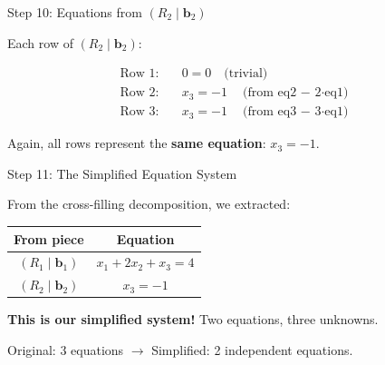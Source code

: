 \documentclass[10pt]{beamer}
\theoremstyle{definition}
\newcommand{\x}[1]{\alert{\textbf{#1}}}
\begin{document}
\begin{frame}{Step 10: Equations from $(R_2 \mid \mathbf{b}_2)$}

Each row of $(R_2 \mid \mathbf{b}_2)$:

\vspace{0.5em}

\begin{align*}
\text{Row 1}: &\quad 0 = 0 \quad \text{(trivial)} \\
\text{Row 2}: &\quad x_3 = -1 \quad \text{(from eq2 $-$ 2·eq1)} \\
\text{Row 3}: &\quad x_3 = -1 \quad \text{(from eq3 $-$ 3·eq1)}
\end{align*}

\vspace{1em}

Again, all rows represent the \x{same equation}: $x_3 = -1$.

\end{frame}

\begin{frame}{Step 11: The Simplified Equation System}

From the cross-filling decomposition, we extracted:

\vspace{1em}

\begin{center}
\begin{tabular}{c|c}
\textbf{From piece} & \textbf{Equation} \\
\hline
$(R_1 \mid \mathbf{b}_1)$ & $x_1 + 2x_2 + x_3 = 4$ \\
\hline
$(R_2 \mid \mathbf{b}_2)$ & $x_3 = -1$ \\
\end{tabular}
\end{center}

\vspace{1em}

\x{This is our simplified system!} Two equations, three unknowns.

\vspace{1em}

Original: 3 equations $\to$ Simplified: 2 independent equations.

\end{frame}
\end{document}
